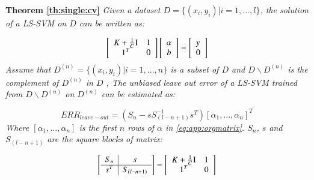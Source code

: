 \textbf{Theorem \ref{th:single:cv}}
\textit{	Given a dataset $D=\{(x_i,y_i)|i=1,...,l\}$, the solution of a LS-SVM on $D$ can be written as:}
	
	\begin{equation}\label{eq:app:orgmatrix}
	\left[ {\begin{array}{*{20}{c}}
		{K  + \frac{1}{C}{\rm I}}\\
		1^T
		\end{array}\begin{array}{*{20}{c}}
		1\\
		0
		\end{array}} \right]\left[ {\begin{array}{*{20}{c}}
		\alpha \\
		b
		\end{array}} \right] = \left[ \begin{array}{l}
	y\\
	0
	\end{array} \right]
	\end{equation}
	\textit{Assume that $D^{(n)} = \{(x_i,y_i)|i=1,...,n\}$ is a subset of $D$ and $D\backslash D^{(n)}$ is the complement of $D^{(n)}$ in $D$ , The unbiased leave out error of a LS-SVM trained from $D\backslash D^{(n)}$ on $D^{(n)}$ can be estimated as:}
	
	\begin{equation*}%
	ERR_{leave-out} = \left( {{S_n} - sS_{(l - n + 1)}^{ - 1}{s^T}} \right){\left[ {{\alpha _1},...,{\alpha _n}} \right]^T}
	\end{equation*}
	\textit{Where $\left[\alpha_1,...,\alpha_n\right]$ is the first $n$ rows of $\alpha$ in \eqref{eq:app:orgmatrix}. $S_n$, $s$ and $S_{(l - n + 1)}$ are the square blocks of matrix:}
	
	\begin{equation*}
	\left[ {\begin{array}{c|c}
		{{S_{n }}} &s\\ \hline
		{{s^T}}&{{S_{(l - n + 1)}}}
		\end{array}} \right] =\left[ {\begin{array}{*{20}{c}}
		{K  + \frac{1}{C}{\rm I}}\\
		1^T
		\end{array}\begin{array}{*{20}{c}}
		1\\
		0
		\end{array}} \right]
	\end{equation*}

